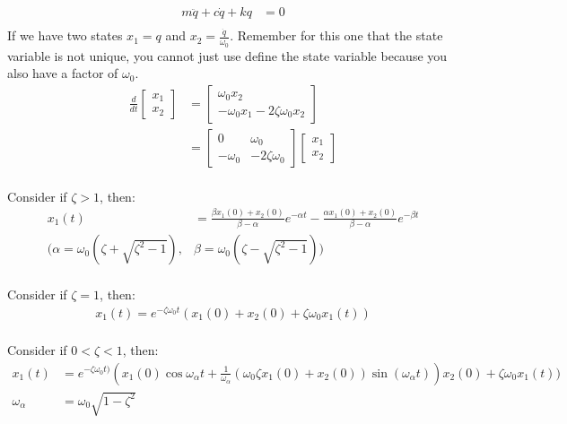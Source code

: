 \documentclass[12pt]{article}
\theoremstyle{definition}
\begin{document}
\begin{itemize}
    \begin{align*}
        m\ddot{q} + c\dot{q} + kq &= 0 \\
    \end{align*}
    If we have two states $x_1 = q$ and $x_2 = \frac{\dot{q}}{\omega_0}$. Remember for this one that the state variable is not unique, you cannot just use define the state variable because you also have a factor of $\omega_0$.
    \begin{align*}
        \frac{d}{dt} \begin{bmatrix} x_1 \\ x_2 \end{bmatrix} &= \begin{bmatrix} \omega_0 x_2 \\ -\omega_0 x_1 - 2\zeta \omega_0 x_2 \end{bmatrix} \\
        &= \begin{bmatrix}0 & \omega_0 \\ -\omega_0 & -2 \zeta \omega_0 \end{bmatrix} \begin{bmatrix} x_1 \\ x_2 \end{bmatrix} \\
    \end{align*}

    Consider if $\zeta > 1$, then:
    \begin{align*}
        x_1(t) &= \frac{\beta x_1(0) + x_2(0) }{\beta - \alpha} e^{-\alpha t} - \frac{\alpha x_1(0) + x_2(0)}{\beta - \alpha} e^{-\beta t} \\
        (\alpha = \omega_0(\zeta + \sqrt{\zeta^2 - 1}), & \beta = \omega_0 (\zeta - \sqrt{\zeta^2 - 1})) \\
    \end{align*}

    Consider if $\zeta = 1$, then:
    \begin{align*}
        x_1(t) = e^{-\zeta \omega_0 t}(x_1(0) + x_2(0) + \zeta\omega_0 x_1(t)) \\
    \end{align*}

    Consider if $0 < \zeta < 1$, then:
    \begin{align*}
        x_1(t) &= e^{-\zeta \omega_0 t)}(x_1(0)\cos \omega_\alpha t + \frac{1}{\omega_\alpha}(\omega_0 \zeta x_1(0) + x_2(0))\sin(\omega_\alpha t)) x_2(0) + \zeta\omega_0 x_1(t)) \\
        \omega_\alpha &= \omega_0 \sqrt{1 - \zeta^2} \\
    \end{align*}


\end{itemize}
\end{document}
